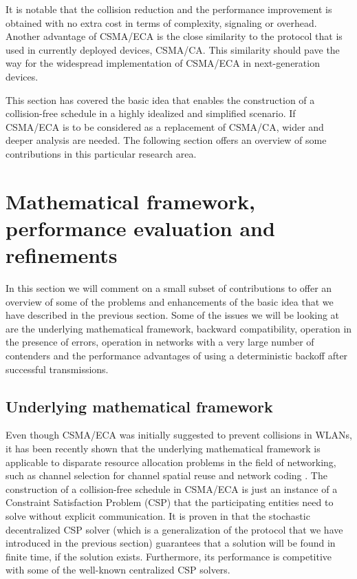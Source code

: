 \documentclass[journal]{IEEEtran}
\begin{document}
It is notable that the collision reduction and the performance improvement is obtained with no extra cost in terms of complexity, signaling or overhead.
Another advantage of CSMA/ECA is the close similarity to the protocol that is used in currently deployed devices, CSMA/CA.
This similarity should pave the way for the widespread implementation of CSMA/ECA in next-generation devices.

This section has covered the basic idea that enables the construction of a collision-free schedule in a highly idealized and simplified scenario. If CSMA/ECA is to be considered as a replacement of CSMA/CA, wider and deeper analysis are needed. The following section offers an overview of some contributions in this particular research area.

\section{Mathematical framework, performance evaluation and refinements}
\label{sec:survey}
In this section we will comment on a small subset of contributions to offer an overview of some of the problems and enhancements of the basic idea that we have described in the previous section. 
Some of the issues we will be looking at are the underlying mathematical framework, backward compatibility, operation in the presence of errors, operation in networks with a very large number of contenders and the performance advantages of using a deterministic backoff after successful transmissions. 

\subsection{Underlying mathematical framework}
Even though CSMA/ECA was initially suggested to prevent collisions in WLANs, it has been recently shown that the underlying mathematical framework is applicable to disparate resource allocation problems in the field of networking, such as channel selection for channel spatial reuse and network coding \cite{duffy2011dcs}.
The construction of a collision-free schedule in CSMA/ECA is just an instance of a Constraint Satisfaction Problem (CSP) that the participating entities need to solve without explicit communication.
It is proven in \cite{duffy2011dcs} that the stochastic decentralized CSP solver (which is a generalization of the protocol that we have introduced in the previous section) guarantees that a solution will be found in finite time, if the solution exists.
Furthermore, its performance is competitive with some of the well-known centralized CSP solvers.
\end{document}
